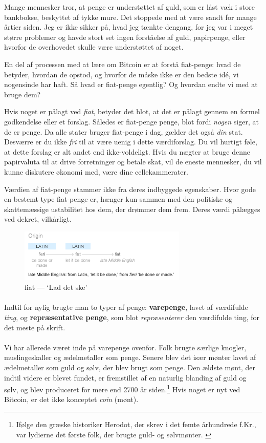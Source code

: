 \documentclass[paper=6in:9in,pagesize=pdftex,
               headinclude=on,footinclude=on,12pt]{scrbook}
\begin{document}
Mange mennesker tror, at penge er understøttet af guld, som er låst væk i store bankbokse, beskyttet af tykke mure. Det stoppede med at være sandt for mange årtier siden. Jeg er ikke sikker på, hvad jeg tænkte dengang, for jeg var i meget større problemer og havde stort set ingen forståelse af guld, papirpenge, eller hvorfor de overhovedet skulle være understøttet af noget.

En del af processen med at lære om Bitcoin er at forstå fiat-penge: hvad de betyder, hvordan de opstod, og hvorfor de måske ikke er den bedste id\'e, vi nogensinde har haft. Så hvad er fiat-penge egentlig? Og hvordan endte vi med at bruge dem?

Hvis noget er pålagt ved \textit{fiat}, betyder det blot, at det er pålagt gennem en formel godkendelse eller et forslag. Således er fiat-penge penge, blot fordi \textit{nogen} siger, at de er penge. Da alle stater bruger fiat-penge i dag, gælder det også \textit{din} stat. Desværre er du ikke \textit{fri} til at være uenig i dette værdiforslag. Du vil hurtigt føle, at dette forslag er alt andet end ikke-voldeligt. Hvis du nægter at bruge denne papirvaluta til at drive forretninger og betale skat, vil de eneste mennesker, du vil kunne diskutere økonomi med, være dine cellekammerater.

Værdien af fiat-penge stammer ikke fra deres indbyggede egenskaber. Hvor gode en bestemt type fiat-penge er, hænger kun sammen med den politiske og skattemæssige ustabilitet hos dem, der drømmer dem frem. Deres værdi pålægges ved dekret, vilkårligt.\begin{figure}
  \centering
  \includegraphics[width=8cm]{assets/images/fiat-definition.png}
  \caption{fiat — `Lad det ske'}
  \label{fig:fiat-definition}
\end{figure}

\paragraph{} Indtil for nylig brugte man to typer af penge: \textbf{varepenge}, lavet af værdifulde \textit{ting}, og \textbf{repræsentative penge}, som blot \textit{repræsenterer} den værdifulde ting, for det meste på skrift.\paragraph{} Vi har allerede været inde på varepenge ovenfor. Folk brugte særlige knogler, muslingeskaller og ædelmetaller som penge. Senere blev det især mønter lavet af ædelmetaller som guld og sølv, der blev brugt som penge. Den ældste mønt, der indtil videre er blevet fundet, er fremstillet af en naturlig blanding af guld og sølv, og blev produceret for mere end 2700 år siden.\footnote{Ifølge den græske historiker Herodot, der skrev i det femte århundrede f.Kr., var lydierne det første folk, der brugte guld- og sølvmønter. \cite{coinage-origins}} Hvis noget er nyt ved Bitcoin, er det ikke konceptet \textit{coin} (mønt).\newpage
\end{document}
